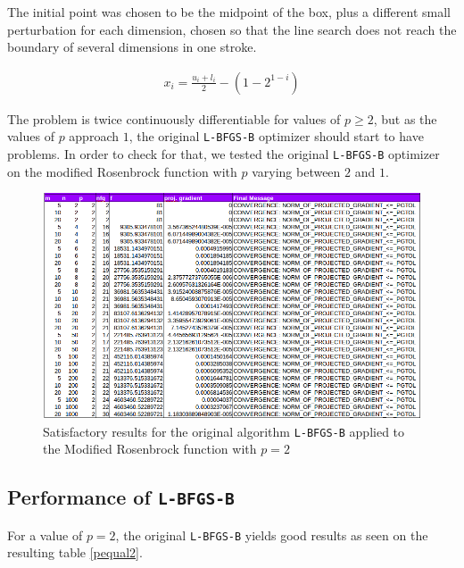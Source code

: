 The initial point was chosen to be the midpoint of the box, plus a different small perturbation for each dimension, chosen so that the line search does not reach the boundary of several dimensions in one stroke.

\begin{equation}
  \begin{aligned}
    x_i = \frac{u_i + l_i}{2} - \left(1 - 2^{1 - i}\right)
  \end{aligned}
\end{equation}

The problem is twice continuously differentiable for values of $p \geq 2$, but as the values of $p$ approach $1$, the original \texttt{L-BFGS-B} optimizer should start to have problems. In order to check for that, we tested the original \texttt{L-BFGS-B} optimizer on the modified Rosenbrock function with $p$ varying between $2$ and $1$. 


\begin{figure}
\begin{center}
\includegraphics[scale=0.48]{Figures/Nocedalp2.png}
\caption[Modified Rosenbrock with $p = 2$]{Satisfactory results for the original algorithm \texttt{L-BFGS-B} applied to the Modified Rosenbrock function with $p = 2$}
\label{pequal2}
\end{center}
\end{figure}

\subsection{Performance of \texttt{L-BFGS-B}}

For a value of $p = 2$, the original \texttt{L-BFGS-B} yields good results as seen on the resulting table \eqref{pequal2}.

